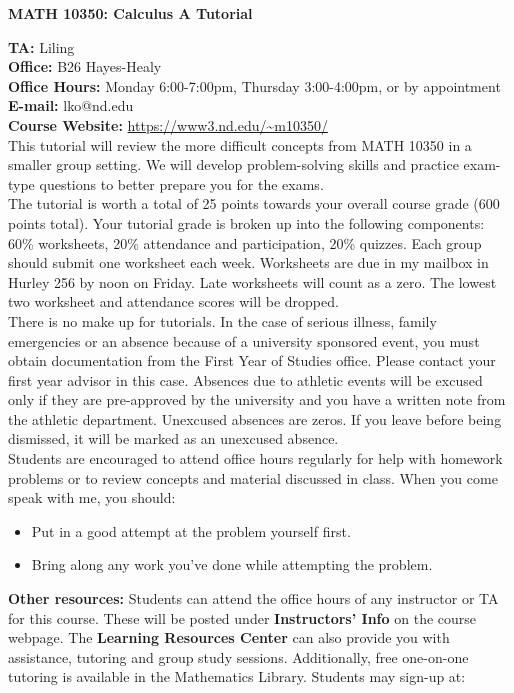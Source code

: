 \documentclass{article}[12pt]
\begin{document}
\begin{center}{\bf MATH 10350: Calculus A Tutorial} \end{center}
{\bf TA:} Liling\\
{\bf Office:} B26 Hayes-Healy\\
{\bf Office Hours:} Monday 6:00-7:00pm, Thursday 3:00-4:00pm, or by appointment\\
{\bf E-mail:} lko@nd.edu\\
{\bf Course Website:} \url{https://www3.nd.edu/~m10350/}\\

 This tutorial will review the more difficult
concepts from MATH 10350 in a smaller group setting. We will develop
problem-solving skills and practice exam-type questions to better prepare
you for the exams.\\

 The tutorial is worth a total of 25 points
towards your overall course grade (600 points total). Your tutorial grade
is broken up into the following components: 60\% worksheets, 20\%
attendance and participation, 20\% quizzes. Each group should submit one
worksheet each week. Worksheets are due in my mailbox in Hurley 256 by noon
on Friday. Late worksheets will count as a zero. The lowest two worksheet
and attendance scores will be dropped. \\

 There is no make up for tutorials. In the case
of serious illness, family emergencies or an absence because of a
university sponsored event, you must obtain documentation from the First
Year of Studies office. Please contact your first year advisor in this
case. Absences due to athletic events will be excused only if they are
pre-approved by the university and you have a written note from the
athletic department. Unexcused absences are zeros. If you leave before
being dismissed, it will be marked as an unexcused absence. \\

 Students are encouraged to attend office
hours regularly for help with homework problems or to review concepts and
material discussed in class. When you come speak with me, you should:
\begin{itemize}
  \item Put in a good attempt at the problem yourself first. 
  \item Bring along any work you've done while attempting the problem. 
\end{itemize}
{\bf Other resources:} Students can attend the office hours of any
instructor or TA for this course. These will be posted under {\bf
Instructors' Info} on the course webpage. The {\bf Learning Resources
Center} can also provide you with assistance, tutoring and group study
sessions. Additionally, free one-on-one tutoring is available in the
Mathematics Library. Students may sign-up at:
\end{document}
